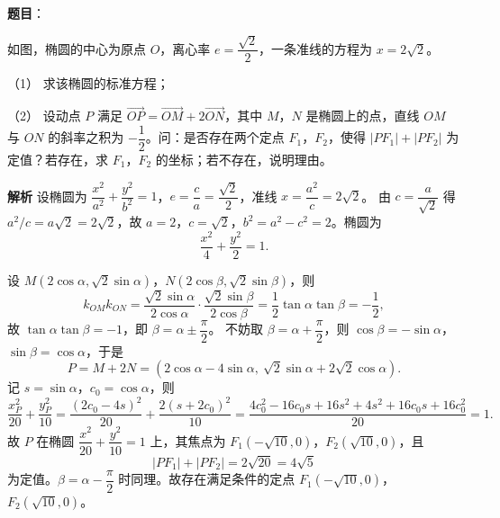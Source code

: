 \begin{answer}

\textbf{题目}：

如图，椭圆的中心为原点 $O$，离心率 $e=\dfrac{\sqrt2}2$，一条准线的方程为 $x=2\sqrt2$。

（1） 求该椭圆的标准方程；

（2） 设动点 $P$ 满足 $\overrightarrow{OP}=\overrightarrow{OM}+2\overrightarrow{ON}$，其中 $M$，$N$ 是椭圆上的点，直线 $OM$ 与 $ON$ 的斜率之积为 $-\dfrac12$。问：是否存在两个定点 $F_1$，$F_2$，使得 $|PF_1|+|PF_2|$ 为定值？若存在，求 $F_1$，$F_2$ 的坐标；若不存在，说明理由。
\nopagebreak[4]
\begin{center}\end{center}
\nopagebreak[4]
\textbf{解析}
设椭圆为 $\dfrac{x^2}{a^2}+\dfrac{y^2}{b^2}=1$，$e=\dfrac ca=\dfrac{\sqrt2}2$，准线 $x=\dfrac{a^2}c=2\sqrt2$。
由 $c=\dfrac a{\sqrt2}$ 得 $a^2/c=a\sqrt2=2\sqrt2$，故 $a=2$，$c=\sqrt2$，$b^2=a^2-c^2=2$。椭圆为
\nopagebreak[4]
\[\frac{x^2}4+\frac{y^2}2=1.\]

设 $M(2\cos\alpha,\sqrt2\sin\alpha)$，$N(2\cos\beta,\sqrt2\sin\beta)$，则
\nopagebreak[4]
\[k_{OM}k_{ON}=\frac{\sqrt2\sin\alpha}{2\cos\alpha}\cdot\frac{\sqrt2\sin\beta}{2\cos\beta}=\frac12\tan\alpha\tan\beta=-\frac12,\]
故 $\tan\alpha\tan\beta=-1$，即 $\beta=\alpha\pm\dfrac\pi2$。
不妨取 $\beta=\alpha+\dfrac\pi2$，则 $\cos\beta=-\sin\alpha$，$\sin\beta=\cos\alpha$，于是
\nopagebreak[4]
\[P=M+2N=(2\cos\alpha-4\sin\alpha,\ \sqrt2\sin\alpha+2\sqrt2\cos\alpha).\]
记 $s=\sin\alpha$，$c_0=\cos\alpha$，则
\nopagebreak[4]
\[\frac{x_P^2}{20}+\frac{y_P^2}{10}=\frac{(2c_0-4s)^2}{20}+\frac{2(s+2c_0)^2}{10}
=\frac{4c_0^2-16c_0s+16s^2+4s^2+16c_0s+16c_0^2}{20}=1.\]
故 $P$ 在椭圆 $\dfrac{x^2}{20}+\dfrac{y^2}{10}=1$ 上，其焦点为 $F_1(-\sqrt{10},0)$，$F_2(\sqrt{10},0)$，且
\nopagebreak[4]
\[|PF_1|+|PF_2|=2\sqrt{20}=4\sqrt5\]
为定值。$\beta=\alpha-\dfrac\pi2$ 时同理。故存在满足条件的定点 $F_1(-\sqrt{10},0)$，$F_2(\sqrt{10},0)$。



\end{answer}
